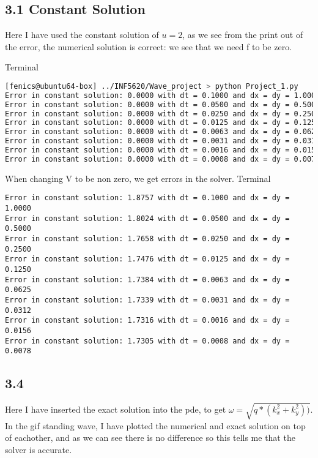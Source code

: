 \documentclass[a4paper,norsk]{article}
\begin{document}
\subsection*{3.1 Constant Solution}
Here I have used the constant solution of $u = 2 $, as we see from the print out of the error, the numerical solution is correct:
we see that we need f to be zero.

\noindent Terminal
\begin{lstlisting}[language=bash]
[fenics@ubuntu64-box] ../INF5620/Wave_project > python Project_1.py 
Error in constant solution: 0.0000 with dt = 0.1000 and dx = dy = 1.0000
Error in constant solution: 0.0000 with dt = 0.0500 and dx = dy = 0.5000
Error in constant solution: 0.0000 with dt = 0.0250 and dx = dy = 0.2500
Error in constant solution: 0.0000 with dt = 0.0125 and dx = dy = 0.1250
Error in constant solution: 0.0000 with dt = 0.0063 and dx = dy = 0.0625
Error in constant solution: 0.0000 with dt = 0.0031 and dx = dy = 0.0312
Error in constant solution: 0.0000 with dt = 0.0016 and dx = dy = 0.0156
Error in constant solution: 0.0000 with dt = 0.0008 and dx = dy = 0.0078

\end{lstlisting}
When changing V to be non zero, we get errors in the solver.
\noindent Terminal
\begin{lstlisting}
Error in constant solution: 1.8757 with dt = 0.1000 and dx = dy = 1.0000
Error in constant solution: 1.8024 with dt = 0.0500 and dx = dy = 0.5000
Error in constant solution: 1.7658 with dt = 0.0250 and dx = dy = 0.2500
Error in constant solution: 1.7476 with dt = 0.0125 and dx = dy = 0.1250
Error in constant solution: 1.7384 with dt = 0.0063 and dx = dy = 0.0625
Error in constant solution: 1.7339 with dt = 0.0031 and dx = dy = 0.0312
Error in constant solution: 1.7316 with dt = 0.0016 and dx = dy = 0.0156
Error in constant solution: 1.7305 with dt = 0.0008 and dx = dy = 0.0078
\end{lstlisting}
\subsection*{3.4}
Here I have inserted the exact solution into the pde, to get $\omega = \sqrt{q*(k_x^2+k_y^2))}$.
In the gif standing wave, I have plotted the numerical and exact solution on top of eachother, and as we can see there is no difference so this tells me that the solver is accurate.
\end{document}
